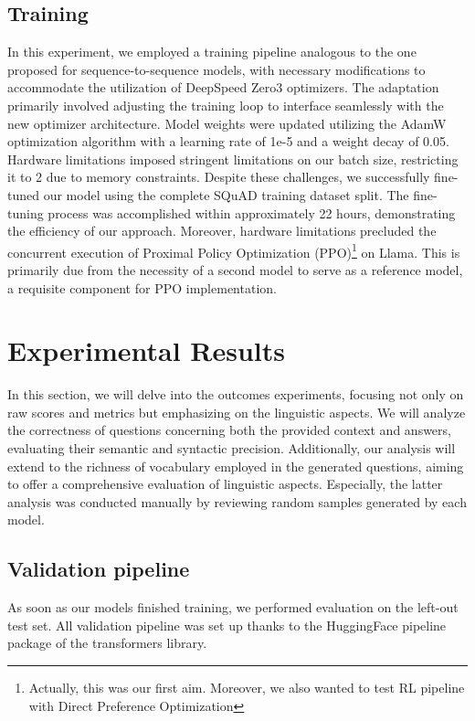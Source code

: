 \documentclass{article}
\begin{document}
\subsection{Training}
In this experiment, we employed a training pipeline analogous to the one proposed for sequence-to-sequence models, with necessary modifications to accommodate the utilization of DeepSpeed Zero3 optimizers. The adaptation primarily involved adjusting the training loop to interface seamlessly with the new optimizer architecture. Model weights were updated utilizing the AdamW optimization algorithm with a learning rate of 1e-5 and a weight decay of 0.05.
Hardware limitations imposed stringent limitations on our batch size, restricting it to 2 due to memory constraints. Despite these challenges, we successfully fine-tuned our model using the complete SQuAD training dataset split. The fine-tuning process was accomplished within approximately 22 hours, demonstrating the efficiency of our approach.
Moreover, hardware limitations precluded the concurrent execution of Proximal Policy Optimization (PPO)\footnote{Actually, this was our first aim. Moreover, we also wanted to test RL pipeline with Direct Preference Optimization} on Llama. This is primarily due from the necessity of a second model to serve as a reference model, a requisite component for PPO implementation.

\section{Experimental Results}
In this section, we will delve into the outcomes experiments, focusing not only on raw scores and metrics but emphasizing on the linguistic aspects. We will analyze the correctness of questions concerning both the provided context and answers, evaluating their semantic and syntactic precision. Additionally, our analysis will extend to the richness of vocabulary employed in the generated questions, aiming to offer a comprehensive evaluation of linguistic aspects. Especially, the latter analysis was conducted manually by reviewing random samples generated by each model.
\subsection{Validation pipeline}
As soon as our models finished training, we performed evaluation on the left-out test set. All validation pipeline was set up thanks to the HuggingFace  pipeline package of the transformers library. 
\end{document}
